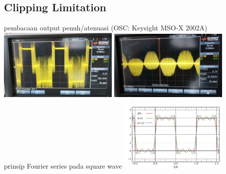 \documentclass[table,dvipsnames]{beamer}
\begin{document}
	\begin{frame}
		\subsection{Clipping Limitation}
		\begin{exampleblock}{pembacaan output penuh/atenuasi (OSC: Keysight MSO-X 2002A)}
			\includegraphics[width=165pt]{images/sinefull_osc}
			\includegraphics[width=165pt]{images/sine_osc}
		\end{exampleblock}
		
		\begin{exampleblock}{prinsip Fourier series pada square wave}
			\centering
			\includegraphics[width=150pt]{images/square_wave_fourier}
		\end{exampleblock}
	\end{frame}
	
\end{document}
